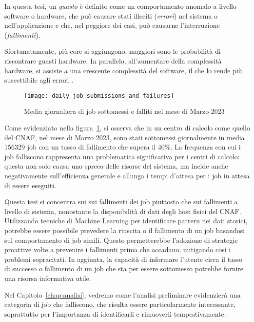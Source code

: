 In questa tesi, un \textit{guasto} è definito come un comportamento anomalo a
livello software o hardware, che può causare stati illeciti (\textit{errori})
nel sistema o nell'applicazione e che, nel peggiore dei casi, può causarne
l'interruzione (\textit{fallimenti}).

Sfortunatamente, più core si aggiungono, maggiori sono le probabilità di
riscontrare guasti hardware. In parallelo, all'aumentare della complessità
hardware, si assiste a una crescente complessità del software, il che lo rende
più suscettibile agli errori \cite{Cappello2014}.

\begin{figure}[!h]
    \begin{center}
        \texttt{[image: daily\_job\_submissions\_and\_failures]}
    \end{center}
    \caption{Media giornaliera di job sottomessi e falliti nel mese di Marzo
    2023}\label{fig:daily_job_submissions_and_failures}
\end{figure}

Come evidenziato nella figura~\ref{fig:daily_job_submissions_and_failures}, si
osserva che in un centro di calcolo come quello del CNAF, nel mese di Marzo
2023, sono stati sottomessi giornalmente in media 156329 job con un tasso di
fallimento che supera il 40\%. 
La frequenza con cui i job falliscono rappresenta una problematica
significativa per i centri di calcolo: questa non solo causa uno spreco delle
risorse del sistema, ma incide anche negativamente sull'efficienza generale e
allunga i tempi d'attesa per i job in attesa di essere eseguiti.

Questa tesi si concentra sui sui fallimenti dei job piuttosto che sui
fallimenti a livello di sistema, nonostante la disponibilità di dati degli
host fisici del CNAF. Utilizzando tecniche di Machine Learning per
identificare pattern nei dati storici, potrebbe essere possibile prevedere la
riuscita o il fallimento di un job basandosi sul comportamento di job simili.
Questo permetterebbe l'adozione di strategie proattive volte a prevenire i
fallimenti prima che accadano, mitigando così i problemi sopracitati. In
aggiunta, la capacità di informare l'utente circa il tasso di successo o
fallimento di un job che sta per essere sottomesso potrebbe fornire una
risorsa informativa utile.

Nel Capitolo~\ref{chap:analisi}, vedremo come l'analisi preliminare
evidenzierà una categoria di job che falliscono, che risulta essere
particolarmente interessante, soprattutto per l'importanza di identificarli e
rimuoverli tempestivamente.
